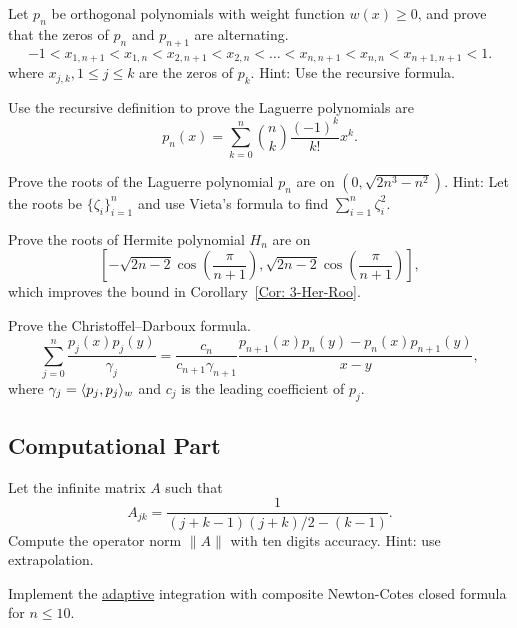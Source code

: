 \begin{problem}[interlacing]
    Let $p_n$ be orthogonal polynomials with weight function $w(x)\ge 0$, and prove that the zeros of $p_n$ and $p_{n+1}$ are alternating. 
    \begin{equation}
        -1 < x_{1, n+1} < x_{1, n} < x_{2,n+1} < x_{2,n}<\dots < x_{n,n+1} < x_{n, n} < x_{n+1, n+1} < 1.
    \end{equation}
    where $x_{j, k}, 1\le j\le k$ are the zeros of $p_k$. Hint: Use the recursive formula.
\end{problem}
\begin{problem}
\label{Prb: 3-Exe-Lag}
    Use the recursive definition to prove the Laguerre polynomials are 
    \begin{equation}
        p_n(x) = \sum_{k=0}^n \binom{n}{k} \frac{(-1)^k}{k!} x^k.
    \end{equation}
\end{problem}
\begin{problem}
\label{Prb: 3-Exe-5}
    Prove the roots of the Laguerre polynomial $p_n$ are on $(0, \sqrt{2n^3 - n^2})$. Hint: Let the roots be $\{\zeta_i\}_{i=1}^n$ and use Vieta's formula to find $\sum_{i=1}^n \zeta_i^2$. 
\end{problem}

\begin{problem}
    Prove the roots of Hermite polynomial $H_n$ are on $$\left[-\sqrt{2n-2}\cos\left(\frac{\pi}{n+1}\right), \sqrt{2n-2}\cos\left(\frac{\pi}{n+1}\right)\right],$$ which improves the bound in Corollary~\ref{Cor: 3-Her-Roo}.
\end{problem}

\begin{problem}
    Prove the Christoffel–Darboux formula. 
    \begin{equation*}
        \sum_{j=0}^n \frac{p_j(x) p_j(y)}{\gamma_j} = \frac{c_{n}}{c_{n+1}\gamma_{n+1}} \frac{p_{n+1}(x)p_n(y) - p_{n}(x)p_{n+1}(y)}{x - y}, 
    \end{equation*}
    where $\gamma_j = \langle {p_j, p_j} \rangle_w$ and $c_j$ is the leading coefficient of $p_j$.
\end{problem}

\subsection{Computational Part}
\begin{problem}
    Let the infinite matrix $A$ such that $$A_{jk} = \frac{1}{(j+k-1)(j+k)/2 - (k-1)}.$$
    Compute the operator norm $\|A\|$ with ten digits accuracy. Hint: use extrapolation.
\end{problem}
\begin{problem}
    Implement the \underline{adaptive} integration with composite Newton-Cotes closed formula for $n \le 10$. 
\end{problem}

